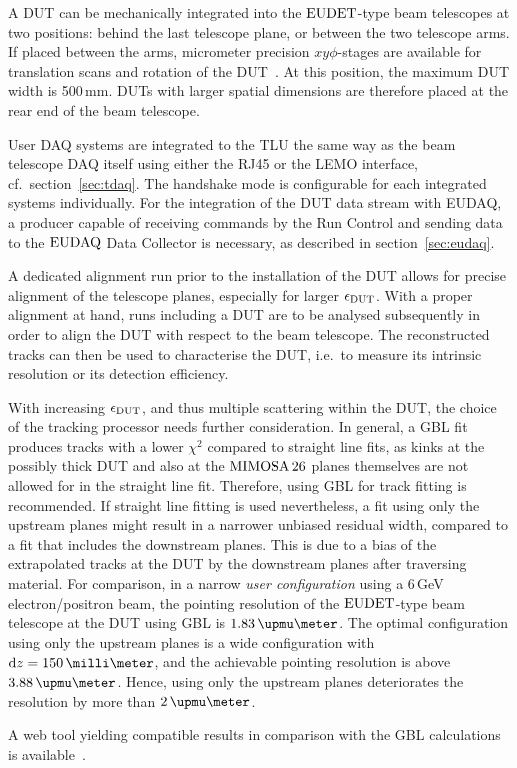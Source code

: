 A DUT can be mechanically integrated into the $\textrm{EUDET}$-type beam telescopes at two positions: behind the last telescope plane, or between the two telescope arms.
If placed between the arms, micrometer precision $xy\phi$-stages are available for translation scans and rotation of the DUT~\cite{Mimosa-twiki}.
At this position, the maximum DUT width is 500\,mm.
DUTs with larger spatial dimensions are therefore placed at the rear end of the beam telescope. 

User DAQ systems are integrated to the TLU the same way as the beam telescope DAQ itself using either the RJ45 or the LEMO interface, cf.~section~\ref{sec:tdaq}.
The handshake mode is configurable for each integrated systems individually. 
For the integration of the DUT data stream with EUDAQ, a producer capable of receiving commands by the Run Control and sending data to the $\textrm{EUDAQ}$ Data Collector is necessary,
 as described in section~\ref{sec:eudaq}.

A dedicated alignment run prior to the installation of the DUT allows for precise alignment of the telescope planes, especially for larger $\mathnormal{\epsilon_{\textrm{DUT}}}$. 
With a proper alignment at hand, runs including a DUT are to be analysed subsequently in order to align the DUT with respect to the beam telescope. 
The reconstructed tracks can then be used to characterise the DUT, i.e.~to measure its intrinsic resolution or its detection efficiency. 

With increasing $\mathnormal{\epsilon_{\textrm{DUT}}}$, and thus multiple scattering within the DUT, the choice of the tracking processor needs further consideration. 
In general, a GBL fit produces tracks with a lower $\chi^2$ compared to straight line fits,
 as kinks at the possibly thick DUT and also at the $\textrm{MIMOSA\,26}$ planes themselves are not allowed for in the straight line fit.
Therefore, using GBL for track fitting is recommended. 
If straight line fitting is used nevertheless, a fit using only the upstream planes might result in a narrower unbiased residual width, compared to a fit that includes the downstream planes. 
This is due to a bias of the extrapolated tracks at the DUT by the downstream planes after traversing material. 
For comparison, in a narrow \textit{user configuration} using a 6\,GeV electron/positron beam, the pointing resolution of the $\textrm{EUDET}$-type beam telescope at the DUT using GBL is $1.83\,\upmu\meter$. 
The optimal configuration using only the upstream planes is a wide configuration with $\dz = 150\,\milli\meter$,
 and the achievable pointing resolution is above $3.88\,\upmu\meter$. 
Hence, using only the upstream planes deteriorates the resolution by more than $2\,\upmu\meter$.

A web tool yielding compatible results in comparison with the GBL calculations is available~\cite{webtool}.